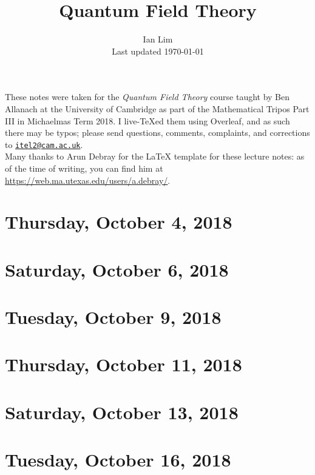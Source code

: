 \documentclass[reqno]{amsart}
\begin{document}
\title{Quantum Field Theory}
\author{Ian Lim\\ Last updated \today}
\maketitle
{\small\noindent These notes were taken for the \textit{Quantum Field Theory} course taught by Ben Allanach at the University of Cambridge as part of the Mathematical Tripos Part III in Michaelmas Term 2018. I live-\TeX ed them using Overleaf, and as such there may be typos; please send questions, comments, complaints, and corrections to 
\href{mailto:itel2@cam.ac.uk?subject=QFT\%20Lecture\%20Notes}{\texttt{itel2@cam.ac.uk}}.\\
Many thanks to Arun Debray for the {\LaTeX} template for these lecture notes: as of the time of writing, you can find him at \url{https://web.ma.utexas.edu/users/a.debray/}.}

\tableofcontents

\section{Thursday, October 4, 2018}
	
	
\section{Saturday, October 6, 2018}
	
	
\section{Tuesday, October 9, 2018}
	
	
\section{Thursday, October 11, 2018}
	
	
\section{Saturday, October 13, 2018}
	
	
\section{Tuesday, October 16, 2018}
	
\end{document}
